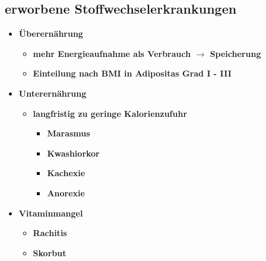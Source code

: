 \subsection{erworbene Stoffwechselerkrankungen}
	\begin{itemize}
		\item \textbf{Überernährung}
			\begin{itemize}
				\item \textbf{mehr Energieaufnahme als Verbrauch $\rightarrow$ Speicherung}
				\item \textbf{Einteilung nach BMI in Adipositas Grad I - III}
			\end{itemize}
		\item \textbf{Unterernährung}
			\begin{itemize}
				\item \textbf{langfristig zu geringe Kalorienzufuhr}
					\begin{itemize}
						\item \textbf{Marasmus}
						\item \textbf{Kwashiorkor}
						\item \textbf{Kachexie}
						\item \textbf{Anorexie}
					\end{itemize}
			\end{itemize}
		\item \textbf{Vitaminmangel}
			\begin{itemize}
				\item \textbf{Rachitis}
				\item \textbf{Skorbut}
			\end{itemize}
	\end{itemize}